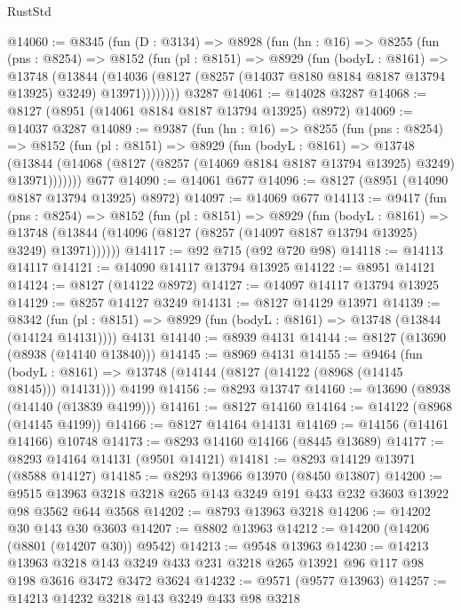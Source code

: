 \begin{lexlean}{RustStd}
\begin{coremodule}
@14060 := @8345
    (fun (D : @3134) =>
    @8928
      (fun (hn : @16) =>
      @8255
        (fun (pns : @8254) =>
        @8152
          (fun (pl : @8151) =>
          @8929
            (fun (bodyL : @8161) =>
            @13748
              (@13844
                (@14036 (@8127 (@8257 (@14037 @8180 @8184 @8187 @13794 @13925) @3249) @13971))))))))
    @3287
@14061 := @14028 @3287
@14068 := @8127 (@8951 (@14061 @8184 @8187 @13794 @13925) @8972)
@14069 := @14037 @3287
@14089 := @9387
    (fun (hn : @16) =>
    @8255
      (fun (pns : @8254) =>
      @8152
        (fun (pl : @8151) =>
        @8929
          (fun (bodyL : @8161) =>
          @13748
            (@13844 (@14068 (@8127 (@8257 (@14069 @8184 @8187 @13794 @13925) @3249) @13971)))))))
    @677
@14090 := @14061 @677
@14096 := @8127 (@8951 (@14090 @8187 @13794 @13925) @8972)
@14097 := @14069 @677
@14113 := @9417
    (fun (pns : @8254) =>
    @8152
      (fun (pl : @8151) =>
      @8929
        (fun (bodyL : @8161) =>
        @13748 (@13844 (@14096 (@8127 (@8257 (@14097 @8187 @13794 @13925) @3249) @13971))))))
@14117 := @92 @715 (@92 @720 @98)
@14118 := @14113 @14117
@14121 := @14090 @14117 @13794 @13925
@14122 := @8951 @14121
@14124 := @8127 (@14122 @8972)
@14127 := @14097 @14117 @13794 @13925
@14129 := @8257 @14127 @3249
@14131 := @8127 @14129 @13971
@14139 := @8342
    (fun (pl : @8151) => @8929 (fun (bodyL : @8161) => @13748 (@13844 (@14124 @14131))))
    @4131
@14140 := @8939 @4131
@14144 := @8127 (@13690 (@8938 (@14140 @13840)))
@14145 := @8969 @4131
@14155 := @9464
    (fun (bodyL : @8161) => @13748 (@14144 (@8127 (@14122 (@8968 (@14145 @8145))) @14131)))
    @4199
@14156 := @8293 @13747
@14160 := @13690 (@8938 (@14140 (@13839 @4199)))
@14161 := @8127 @14160
@14164 := @14122 (@8968 (@14145 @4199))
@14166 := @8127 @14164 @14131
@14169 := @14156 (@14161 @14166) @10748
@14173 := @8293 @14160 @14166 (@8445 @13689)
@14177 := @8293 @14164 @14131 (@9501 @14121)
@14181 := @8293 @14129 @13971 (@8588 @14127)
@14185 := @8293 @13966 @13970 (@8450 @13807)
@14200 := @9515 @13963 @3218 @3218 @265 @143 @3249 @191 @433 @232 @3603 @13922 @98 @3562 @644 @3568
@14202 := @8793 @13963 @3218
@14206 := @14202 @30 @143 @30 @3603
@14207 := @8802 @13963
@14212 := @14200 (@14206 (@8801 (@14207 @30)) @9542)
@14213 := @9548 @13963
@14230 := @14213
    @13963
    @3218
    @143
    @3249
    @433
    @231
    @3218
    @265
    @13921
    @96
    @117
    @98
    @198
    @3616
    @3472
    @3472
    @3624
@14232 := @9571 (@9577 @13963)
@14257 := @14213
    @14232
    @3218
    @143
    @3249
    @433
    @98
    @3218

\end{coremodule}
\end{lexlean}
